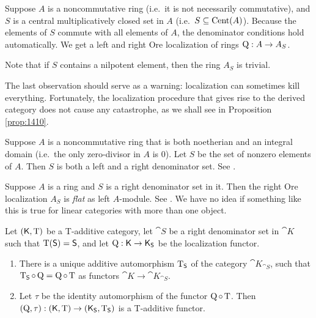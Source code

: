 \begin{exa} \label{exa:1405}
Suppose $A$ is a noncommutative ring (i.e.\ it is not necessarily commutative), 
and $S$ is a central  multiplicatively closed set in $A$ (i.e.\ 
$S \subseteq \operatorname{Cent}(A)$). Because the elements of $S$ commute with all elements 
of $A$, the denominator conditions hold automatically. 
We get a left and right Ore localization of rings 
$\operatorname{Q} : A \to A_S$.

Note that if $S$ contains a nilpotent element, then the ring $A_S$ is trivial. 
\end{exa}

The last observation should serve as a warning: localization can sometimes 
kill everything. Fortunately, the localization procedure that 
gives rise to the derived category does not cause any catastrophe, as we shall 
see in Proposition \ref{prop:1410}.

\begin{exa} \label{exa:4207}
Suppose $A$ is a noncommutative ring that is both noetherian and an integral 
domain (i.e.\ the only zero-divisor in $A$ is $0$). Let $S$ be the set of 
nonzero elements of $A$. Then $S$ is both a left and a right denominator set. 
See \cite[Theorem 2.1.15]{McRo}. 
\end{exa}
 
\begin{rem} \label{rem:1}
Suppose $A$ is a ring and $S$ is a right denominator set in it. 
Then the right Ore localization $A_S$ is {\em flat} as left $A$-module. 
See \cite[Theorem 3.1.20]{Row}. We have no idea if something like this is true 
for linear categories with more than one object. 
\end{rem}

\begin{prop} \label{prop:1840}
Let $(\operatorname{\mathsf{K}}, \operatorname{T})$ be a T-additive category, let
$\cat{S}$ be a right denominator set in $\cat{K}$ such that 
$\operatorname{T}(\operatorname{\mathsf{S}}) = \operatorname{\mathsf{S}}$, and let 
$\operatorname{Q} : \operatorname{\mathsf{K}} \to  \operatorname{\mathsf{K}}_{\operatorname{\mathsf{S}}}$ be the localization functor.
\begin{enumerate}
\item There is a unique additive automorphism
$\operatorname{T}_{\operatorname{\mathsf{S}}}$ of the category $\cat{K}_{\cat{S}}$, such that 
$\operatorname{T}_{\operatorname{\mathsf{S}}} \circ \operatorname{Q} = \operatorname{Q} \circ \operatorname{T}$
as functors $\cat{K} \to  \cat{K}_{\cat{S}}$.

\item Let $\tau$ be the identity automorphism of the functor 
$\operatorname{Q} \circ \operatorname{T}$. Then 
$(\operatorname{Q}, \tau) :  (\operatorname{\mathsf{K}}, \operatorname{T}) \to 
(\operatorname{\mathsf{K}}_{\operatorname{\mathsf{S}}}, \operatorname{T}_{\operatorname{\mathsf{S}}})$
is a T-additive functor. 
\end{enumerate}
\end{prop}

